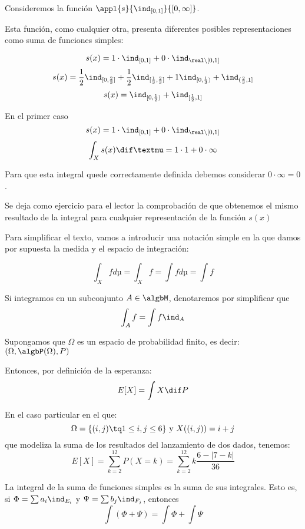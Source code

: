 \documentclass{apuntes}
\begin{document}
\begin{example}
Consideremos la función $\appl{s}{\ind_{[0,1]}}{[0, \infty]}$.

Esta función, como cualquier otra, presenta diferentes posibles representaciones como suma de funciones simples:

\[s(x) = 1\cdot \ind_{[0,1]}+0 \cdot \ind_{\real \setminus [0,1]}\]
\[s(x) = \frac{1}{2}\ind_{[0, \frac{2}{3}]} + \frac{1}{2}\ind_{[\frac{1}{3}, \frac{2}{3}]} +1\ind_{[0, \frac{1}{3})} + \ind_{(\frac{2}{3}, 1]}\]
\[s(x) = \ind_{[0, \frac{1}{2})} + \ind_{[\frac{1}{2}, 1]}\]

En el primer caso
\[s(x) = 1\cdot \ind_{[0,1]}+0 \cdot \ind_{\real \setminus [0,1]}\]
\[\int_X s(x)\dif µ = 1 \cdot 1 + 0 \cdot \infty\]

Para que esta integral quede correctamente definida debemos considerar $0 \cdot \infty = 0$.

Se deja como ejercicio para el lector la comprobación de que obtenemos el mismo resultado de la integral para cualquier representación de la función  $s(x)$
\end{example}

Para simplificar el texto, vamos a introducir una notación simple en la que damos por supuesta la medida y el espacio de integración:

\[ \int_X f dµ = \int_X f = \int f dµ = \int f \]

Si integramos en un subconjunto $A \in \algbM$, denotaremos por simplificar que \[ \int_A f = \int f \ind_A \]

\begin{example}
Supongamos que $\Omega$ es un espacio de probabilidad finito, es decir: $(\Omega, \algbP(\Omega), P)$

Entonces, por definición de la esperanza:
\[E[X] = \int X \dif P\]

En el caso particular en el que:
\[\Omega = \{(i,j) \tq 1 \leq i,j \leq 6\} \text{ y } X((i,j)) = i+j\]
que modeliza la suma de los resultados del lanzamiento de dos dados, tenemos:
\[E[X] = \sum_{k=2}^{12}P(X=k) = \sum_{k=2}^{12}k \frac{6-|7-k|}{36}\]
\end{example}

\begin{prop} La integral de la suma de funciones simples es la suma de sus integrales. Esto es, si $\Phi = \sum a_i \ind_{E_i}$ y $\Psi  = \sum b_j \ind_{F_j}$, entonces
\[\int (\Phi + \Psi) = \int \Phi + \int \Psi\]
\end{prop}
\end{document}
